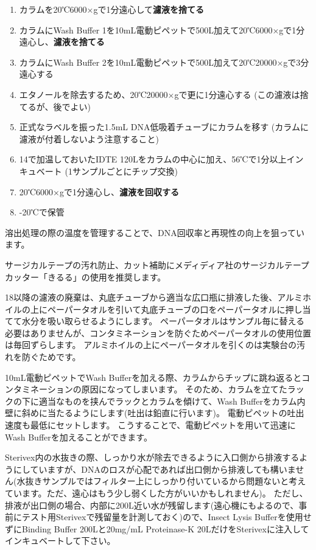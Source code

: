 \documentclass[titlepage,10pt,a4paper,uplatex]{jsbook}
\renewcommand{\textbf}[1]{{\bfseries\sffamily#1}}
\begin{document}
\begin{enumerate}
\item カラムを20℃6000×gで1分遠心して\textbf{濾液を捨てる}
\item カラムにWash Buffer 1を10mL電動ピペットで500{\textmu}L加えて20℃6000×gで1分遠心し、\textbf{濾液を捨てる}
\item カラムにWash Buffer 2を10mL電動ピペットで500{\textmu}L加えて20℃20000×gで3分遠心する
\item エタノールを除去するため、20℃20000×gで更に1分遠心する (この濾液は捨てるが、後でよい)
\item 正式なラベルを振った1.5mL DNA低吸着チューブにカラムを移す (カラムに濾液が付着しないよう注意すること)
\item 14で加温しておいたIDTE 120{\textmu}Lをカラムの中心に加え、56℃で1分以上インキュベート (1サンプルごとにチップ交換)
\item 20℃6000×gで1分遠心し、\textbf{濾液を回収する}
\item -20℃で保管
\end{enumerate}

溶出処理の際の温度を管理することで、DNA回収率と再現性の向上を狙っています。

サージカルテープの汚れ防止、カット補助にメディディア社のサージカルテープカッター「きるる」の使用を推奨します。

18以降の濾液の廃棄は、丸底チューブから適当な広口瓶に排液した後、アルミホイルの上にペーパータオルを引いて丸底チューブの口をペーパータオルに押し当てて水分を吸い取らせるようにします。
ペーパータオルはサンプル毎に替える必要はありませんが、コンタミネーションを防ぐためペーパータオルの使用位置は毎回ずらします。
アルミホイルの上にペーパータオルを引くのは実験台の汚れを防ぐためです。

10mL電動ピペットでWash Bufferを加える際、カラムからチップに跳ね返るとコンタミネーションの原因になってしまいます。
そのため、カラムを立てたラックの下に適当なものを挟んでラックとカラムを傾けて、Wash Bufferをカラム内壁に斜めに当たるようにします(吐出は鉛直に行います)。
電動ピペットの吐出速度も最低にセットします。
こうすることで、電動ピペットを用いて迅速にWash Bufferを加えることができます。

Sterivex内の水抜きの際、しっかり水が除去できるように入口側から排液するようにしていますが、DNAのロスが心配であれば出口側から排液しても構いません(水抜きサンプルではフィルター上にしっかり付いているから問題ないと考えています。ただ、遠心はもう少し弱くした方がいいかもしれません)。
ただし、排液が出口側の場合、内部に200{\textmu}L近い水が残留します(遠心機にもよるので、事前にテスト用Sterivexで残留量を計測しておく)ので、Insect Lysis Bufferを使用せずにBinding Buffer 200{\textmu}Lと20mg/mL Proteinase-K 20{\textmu}LだけをSterivexに注入してインキュベートして下さい。
\end{document}
